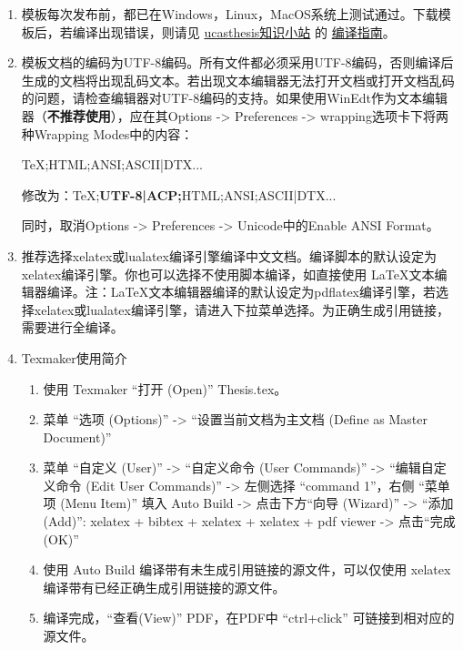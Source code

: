 \begin{enumerate}
    \item 模板每次发布前，都已在Windows，Linux，MacOS系统上测试通过。下载模板后，若编译出现错误，则请见 \href{https://github.com/mohuangrui/ucasthesis/wiki}{ucasthesis知识小站} 的 \href{https://github.com/mohuangrui/ucasthesis/wiki/%E7%BC%96%E8%AF%91%E6%8C%87%E5%8D%97}{编译指南}。

    \item 模板文档的编码为UTF-8编码。所有文件都必须采用UTF-8编码，否则编译后生成的文档将出现乱码文本。若出现文本编辑器无法打开文档或打开文档乱码的问题，请检查编辑器对UTF-8编码的支持。如果使用WinEdt作为文本编辑器（\textbf{不推荐使用}），应在其Options -> Preferences -> wrapping选项卡下将两种Wrapping Modes中的内容：
        
        TeX;HTML;ANSI;ASCII|DTX...
        
        修改为：TeX;\textbf{UTF-8|ACP;}HTML;ANSI;ASCII|DTX...
        
        同时，取消Options -> Preferences -> Unicode中的Enable ANSI Format。

    \item 推荐选择xelatex或lualatex编译引擎编译中文文档。编译脚本的默认设定为xelatex编译引擎。你也可以选择不使用脚本编译，如直接使用 \LaTeX{}文本编辑器编译。注：\LaTeX{}文本编辑器编译的默认设定为pdflatex编译引擎，若选择xelatex或lualatex编译引擎，请进入下拉菜单选择。为正确生成引用链接，需要进行全编译。

    \item Texmaker使用简介
        \begin{enumerate}
            \footnotesize
            \item 使用 Texmaker “打开 (Open)” Thesis.tex。
            \item 菜单 “选项 (Options)” -> “设置当前文档为主文档 (Define as Master Document)”
            \item 菜单 “自定义 (User)” -> “自定义命令 (User Commands)” -> “编辑自定义命令 (Edit User Commands)” -> 左侧选择 “command 1”，右侧 “菜单项 (Menu Item)” 填入 Auto Build -> 点击下方“向导 (Wizard)” -> “添加 (Add)”: xelatex + bibtex + xelatex + xelatex + pdf viewer -> 点击“完成 (OK)”
            \item 使用 Auto Build 编译带有未生成引用链接的源文件，可以仅使用 xelatex 编译带有已经正确生成引用链接的源文件。
            \item 编译完成，“查看(View)” PDF，在PDF中 “ctrl+click” 可链接到相对应的源文件。
        \end{enumerate}
    

\end{enumerate}
